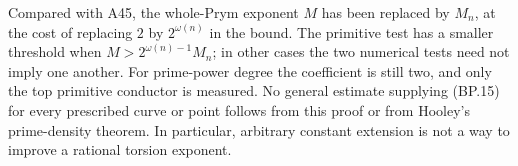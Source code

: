 Compared with A45, the whole-Prym exponent $M$ has been replaced
by $M_n$, at the cost of replacing $2$ by $2^{\omega(n)}$ in
the bound. The primitive test has a smaller threshold when
$M>2^{\omega(n)-1}M_n$; in other cases the two numerical tests
need not imply one another. For prime-power degree the coefficient
is still two, and only the top primitive conductor is measured.
No general estimate supplying (BP.15) for every prescribed curve
or point follows from this proof or from Hooley's prime-density
theorem. In particular, arbitrary constant extension is not a
way to improve a rational torsion exponent.
